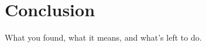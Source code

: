 \chapter{Conclusion}
\label{chap:conclusion}

What you found, what it means, and what's left to do.

